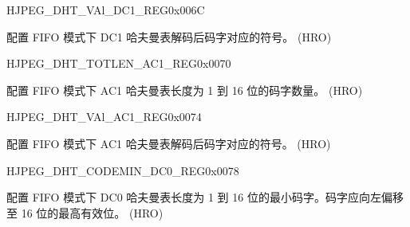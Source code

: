\begin{register}{H}{JPEG\_DHT\_VAl\_DC1\_REG}{0x006C}\label{regdesc:JPEGDHTVALDC1REG}
%
\regnewline%
\begin{regdesc}\begin{reglist}
\label{fielddesc:JPEGDHTVALDC1}\item [JPEG\_DHT\_VAL\_DC1] 配置 FIFO 模式下 DC1 哈夫曼表解码后码字对应的符号。 (HRO)
\end{reglist}\end{regdesc}
\end{register}


\begin{register}{H}{JPEG\_DHT\_TOTLEN\_AC1\_REG}{0x0070}\label{regdesc:JPEGDHTTOTLENAC1REG}
%
\regnewline%
\begin{regdesc}\begin{reglist}
\label{fielddesc:JPEGDHTTOTLENAC1}\item [JPEG\_DHT\_TOTLEN\_AC1] 配置 FIFO 模式下 AC1 哈夫曼表长度为 1 到 16 位的码字数量。 (HRO)
\end{reglist}\end{regdesc}
\end{register}


\begin{register}{H}{JPEG\_DHT\_VAl\_AC1\_REG}{0x0074}\label{regdesc:JPEGDHTVALAC1REG}
%
\regnewline%
\begin{regdesc}\begin{reglist}
\label{fielddesc:JPEGDHTVALAC1}\item [JPEG\_DHT\_VAL\_AC1] 配置 FIFO 模式下 AC1 哈夫曼表解码后码字对应的符号。 (HRO)
\end{reglist}\end{regdesc}
\end{register}


\begin{register}{H}{JPEG\_DHT\_CODEMIN\_DC0\_REG}{0x0078}\label{regdesc:JPEGDHTCODEMINDC0REG}
%
\regnewline%
\begin{regdesc}\begin{reglist}
\label{fielddesc:JPEGDHTCODEMINDC0}\item [JPEG\_DHT\_CODEMIN\_DC0] 配置 FIFO 模式下 DC0 哈夫曼表长度为 1 到 16 位的最小码字。码字应向左偏移至 16 位的最高有效位。 (HRO)
\end{reglist}\end{regdesc}
\end{register}


